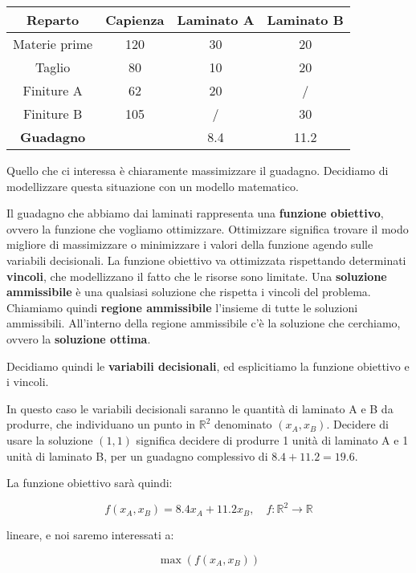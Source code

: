 \documentclass[a4paper,11pt]{article}
\begin{document}
\begin{table}[h!]
	\center {}
	\begin{tabular} { c || c | c | c }
		\bfseries Reparto & \bfseries Capienza & \bfseries Laminato A & \bfseries Laminato B \\
		\hline 
		Materie prime & 120 & 30 & 20 \\
		Taglio & 80 & 10 & 20 \\
		Finiture A & 62 & 20 & / \\
		Finiture B & 105 & / & 30 \\
		\hline
		\textbf{Guadagno} & & 8.4 & 11.2 \\
	\end{tabular}
\end{table}

Quello che ci interessa è chiaramente massimizzare il guadagno.
Decidiamo di modellizzare questa situazione con un modello matematico.

Il guadagno che abbiamo dai laminati rappresenta una \textbf{funzione obiettivo}, ovvero la funzione che vogliamo ottimizzare.
Ottimizzare significa trovare il modo migliore di massimizzare o minimizzare i valori della funzione agendo sulle variabili decisionali.
La funzione obiettivo va ottimizzata rispettando determinati \textbf{vincoli}, che modellizzano il fatto che le risorse sono limitate.
Una \textbf{soluzione ammissibile} è una qualsiasi soluzione che rispetta i vincoli del problema.
Chiamiamo quindi \textbf{regione ammissibile} l'insieme di tutte le soluzioni ammissibili.
All'interno della regione ammissibile c'è la soluzione che cerchiamo, ovvero la \textbf{soluzione ottima}.

Decidiamo quindi le \textbf{variabili decisionali}, ed esplicitiamo la funzione obiettivo e i vincoli.

In questo caso le variabili decisionali saranno le quantità di laminato A e B da produrre, che individuano un punto in $ \mathbb{R}^2 $ denominato $ ( x_A, x_B ) $. 
Decidere di usare la soluzione $ (1,1) $ significa decidere di produrre 1 unità di laminato A e 1 unità di laminato B, per un guadagno complessivo di $ 8.4 + 11.2 = 19.6 $.

La funzione obiettivo sarà quindi:

$$ f(x_A, x_B) = 8.4 x_A + 11.2 x_B, \quad f: \mathbb{R}^2 \rightarrow \mathbb{R} $$

lineare, e noi saremo interessati a:

$$ \max(f(x_A, x_B)) $$
\end{document}
